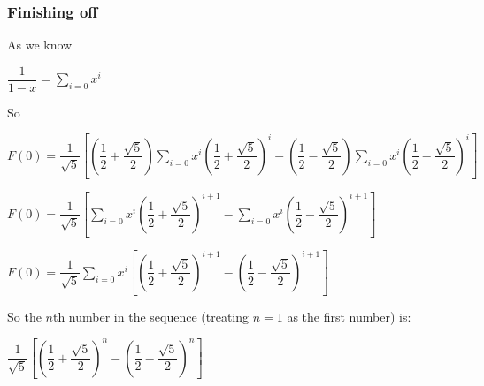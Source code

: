 \subsubsection{Finishing off}

As we know

\(\dfrac{1}{1-x}=\sum_{i=0}x^i \)

So

\(F(0)=\dfrac{1}{\sqrt 5}[(\dfrac{1}{2}+\dfrac{\sqrt 5}{2})\sum_{i=0} x^i(\dfrac{1}{2}+\dfrac{\sqrt 5}{2})^i -(\dfrac{1}{2}-\dfrac{\sqrt 5}{2})\sum_{i=0}x^i(\dfrac{1}{2}-\dfrac{\sqrt 5}{2})^i]\)

\(F(0)=\dfrac{1}{\sqrt 5}[\sum_{i=0} x^i(\dfrac{1}{2}+\dfrac{\sqrt 5}{2})^{i+1} -\sum_{i=0}x^i(\dfrac{1}{2}-\dfrac{\sqrt 5}{2})^{i+1}]\)

\(F(0)=\dfrac{1}{\sqrt 5}\sum_{i=0} x^i[(\dfrac{1}{2}+\dfrac{\sqrt 5}{2})^{i+1} -(\dfrac{1}{2}-\dfrac{\sqrt 5}{2})^{i+1}]\)

So the \(n\)th number in the sequence (treating \(n=1\) as the first number) is:

\(\dfrac{1}{\sqrt 5}[(\dfrac{1}{2}+\dfrac{\sqrt 5}{2})^{n} -(\dfrac{1}{2}-\dfrac{\sqrt 5}{2})^{n}]\)

